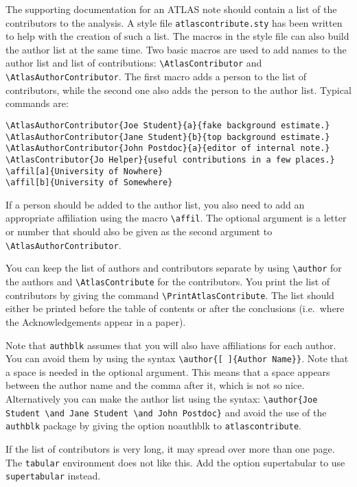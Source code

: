 \documentclass[koma,UKenglish]{style/atlasdoc}
\newcommand{\Macro}[1]{\texttt{\textbackslash #1}\xspace}
\newcommand{\Option}[1]{\textsf{#1}\xspace}
\newcommand{\Package}[1]{\texttt{#1}\xspace}
\begin{document}
The supporting documentation for an ATLAS note should contain a list of the contributors to the analysis.
A style file \Package{atlascontribute.sty} has been written to help with the creation of such a list.
The macros in the style file can also build the author list at the same time.
Two basic macros are used to add names to the author list and list of contributions:
\Macro{AtlasContributor} and \Macro{AtlasAuthorContributor}. 
The first macro adds a person to the list of contributors, while the second one also adds the person
to the author list.
Typical commands are:
\begin{verbatim}
\AtlasAuthorContributor{Joe Student}{a}{fake background estimate.}
\AtlasAuthorContributor{Jane Student}{b}{top background estimate.}
\AtlasAuthorContributor{John Postdoc}{a}{editor of internal note.}
\AtlasContributor{Jo Helper}{useful contributions in a few places.}
\affil[a]{University of Nowhere}
\affil[b]{University of Somewhere}
\end{verbatim}
If a person should be added to the author list, you also need to add an appropriate affiliation using the macro \Macro{affil}.
The optional argument is a letter or number that should also be given as the second argument to
\Macro{AtlasAuthorContributor}.

You can keep the list of authors and contributors separate
by using \Macro{author} for the authors and \Macro{AtlasContribute} for the contributors.
You print the list of contributors by giving the command \Macro{PrintAtlasContribute}.
The list should either be printed before the table of contents or after the conclusions
(i.e.\ where the Acknowledgements appear in a paper).

Note that \Package{authblk} assumes that you will also have affiliations for each author.
You can avoid them by using the syntax \verb|\author{[ ]{Author Name}}|.
Note that a space is needed in the optional argument.
This means that a space appears between the author name and the comma after it, which is not so nice.
Alternatively you can make the author list using the syntax:
\verb|\author{Joe Student \and Jane Student \and John Postdoc}| and avoid the use of the
\Package{authblk} package by giving the option \Option{noauthblk} to \Package{atlascontribute}.

If the list of contributors is very long, it may spread over more than one page.
The \Package{tabular} environment does not like this. Add the option \Option{supertabular} to use 
\Package{supertabular} instead.
\end{document}
